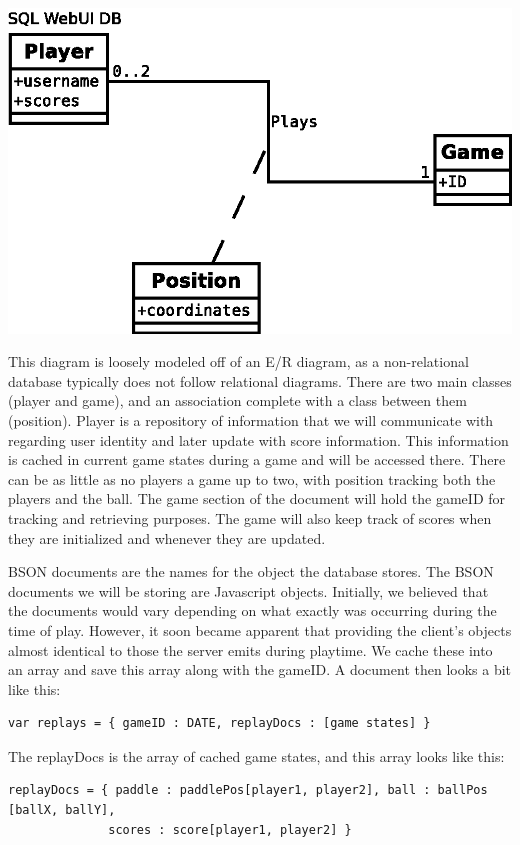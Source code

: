 \documentclass[letterpaper,12pt]{article}
\begin{document}
\begin{center}\includegraphics{ERdia.eps} \end{center} 

This diagram is loosely modeled off of an E/R diagram, as a non-relational database typically does not follow relational diagrams. There are two main classes (player and game), and an association complete with a class between them (position). Player is a repository of information that we will communicate with regarding user identity and later update with score information. This information is cached in current game states during a game and will be accessed there. There can be as little as no players a game up to two, with position tracking both the players and the ball. The game section of the document will hold the gameID for tracking and retrieving purposes. The game will also keep track of scores when they are initialized and whenever they are updated. 

BSON documents are the names for the object the database stores. The BSON documents we will be storing are Javascript objects. Initially, we believed that the documents would vary depending on what exactly was occurring during the time of play. However, it soon became apparent that providing the client’s objects almost identical to those the server emits during playtime. We cache these into an array and save this array along with the gameID. A document then looks a bit like this: 
\begin {verbatim}
var replays = { gameID : DATE, replayDocs : [game states] }
\end{verbatim}
The replayDocs is the array of cached game states, and this array looks like this:
\begin{verbatim}
replayDocs = { paddle : paddlePos[player1, player2], ball : ballPos [ballX, ballY],
              scores : score[player1, player2] }
\end{verbatim}
\end{document}
